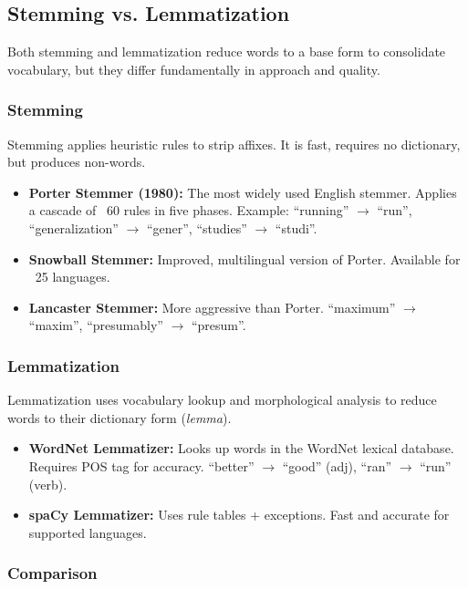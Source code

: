 \subsection{Stemming vs. Lemmatization}
\label{sec:stemming_lemma}

Both stemming and lemmatization reduce words to a base form to consolidate vocabulary, but
they differ fundamentally in approach and quality.

\subsubsection{Stemming}

Stemming applies heuristic rules to strip affixes. It is fast, requires no dictionary, but
produces non-words.

\begin{itemize}
    \item \textbf{Porter Stemmer (1980):} The most widely used English stemmer. Applies a
    cascade of ~60 rules in five phases. Example: ``running'' $\to$ ``run'',
    ``generalization'' $\to$ ``gener'', ``studies'' $\to$ ``studi''.
    \item \textbf{Snowball Stemmer:} Improved, multilingual version of Porter. Available for
    ~25 languages.
    \item \textbf{Lancaster Stemmer:} More aggressive than Porter. ``maximum'' $\to$
    ``maxim'', ``presumably'' $\to$ ``presum''.
\end{itemize}

\subsubsection{Lemmatization}

Lemmatization uses vocabulary lookup and morphological analysis to reduce words to their
dictionary form (\emph{lemma}).

\begin{itemize}
    \item \textbf{WordNet Lemmatizer:} Looks up words in the WordNet lexical database.
    Requires POS tag for accuracy. ``better'' $\to$ ``good'' (adj), ``ran'' $\to$
    ``run'' (verb).
    \item \textbf{spaCy Lemmatizer:} Uses rule tables + exceptions. Fast and accurate for
    supported languages.
\end{itemize}

\subsubsection{Comparison}

